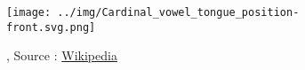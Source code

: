 \begin{center}
  \begin{figure}[h]
    \centering
    \texttt{[image: ../img/Cardinal\_vowel\_tongue\_position-front.svg.png]}
    \caption[]{, Source : \href{https://en.wikipedia.org/wiki/Vowel\#Backness}{Wikipedia}}
    \label{fig:front-vowels-in-the-mouth}
  \end{figure}
\end{center}


\newpage
\minitoc
\newpage

